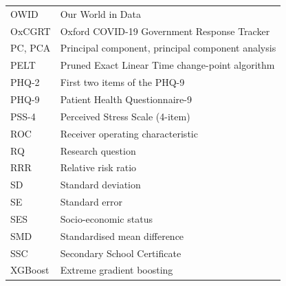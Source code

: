 \begin{singlespace}
\begin{tabular}{@{}p{3cm}p{11cm}@{}}
OWID & Our World in Data \\
OxCGRT & Oxford COVID-19 Government Response Tracker \\
PC, PCA & Principal component, principal component analysis \\
PELT & Pruned Exact Linear Time change-point algorithm \\
PHQ-2 & First two items of the PHQ-9 \\
PHQ-9 & Patient Health Questionnaire-9 \\
PSS-4 & Perceived Stress Scale (4-item) \\
ROC & Receiver operating characteristic \\
RQ & Research question \\
RRR & Relative risk ratio \\
SD & Standard deviation \\
SE & Standard error \\
SES & Socio-economic status \\
SMD & Standardised mean difference \\
SSC & Secondary School Certificate \\
XGBoost & Extreme gradient boosting \\
\end{tabular}
\end{singlespace}
